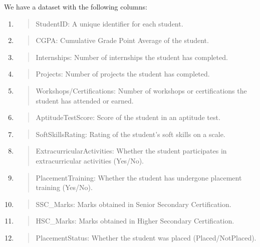\documentclass[]{article}
\begin{document}
We have a dataset with the following columns:

\begin{enumerate}
\def\labelenumi{\arabic{enumi}.}
\item
  \begin{quote}
  StudentID: A unique identifier for each student.
  \end{quote}
\item
  \begin{quote}
  CGPA: Cumulative Grade Point Average of the student.
  \end{quote}
\item
  \begin{quote}
  Internships: Number of internships the student has completed.
  \end{quote}
\item
  \begin{quote}
  Projects: Number of projects the student has completed.
  \end{quote}
\item
  \begin{quote}
  Workshops/Certifications: Number of workshops or certifications the
  student has attended or earned.
  \end{quote}
\item
  \begin{quote}
  AptitudeTestScore: Score of the student in an aptitude test.
  \end{quote}
\item
  \begin{quote}
  SoftSkillsRating: Rating of the student's soft skills on a scale.
  \end{quote}
\item
  \begin{quote}
  ExtracurricularActivities: Whether the student participates in
  extracurricular activities (Yes/No).
  \end{quote}
\item
  \begin{quote}
  PlacementTraining: Whether the student has undergone placement
  training (Yes/No).
  \end{quote}
\item
  \begin{quote}
  SSC\_Marks: Marks obtained in Senior Secondary Certification.
  \end{quote}
\item
  \begin{quote}
  HSC\_Marks: Marks obtained in Higher Secondary Certification.
  \end{quote}
\item
  \begin{quote}
  PlacementStatus: Whether the student was placed (Placed/NotPlaced).
  \end{quote}
\end{enumerate}
\end{document}
